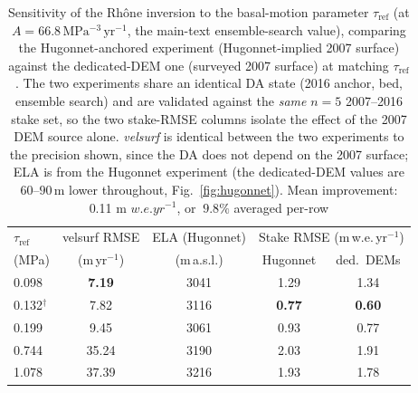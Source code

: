 \begin{table}
  \caption{Sensitivity of the Rhône inversion to the basal-motion parameter
    $\tau_{\mathrm{ref}}$ (at $A=66.8\,\mathrm{MPa^{-3}\,yr^{-1}}$, the main-text
    ensemble-search value), comparing the Hugonnet-anchored experiment
    (Hugonnet-implied 2007 surface) against the dedicated-DEM one (surveyed 2007
    surface) at matching $\tau_{\mathrm{ref}}$. The two experiments share an
    identical DA state (2016 anchor, bed, ensemble search) and are validated
    against the \emph{same} $n=5$ 2007--2016 stake set, so the two stake-RMSE
    columns isolate the effect of the 2007 DEM source alone. \emph{velsurf} is
    identical between the two experiments to the precision shown, since the DA
    does not depend on the 2007 surface; ELA is from the Hugonnet experiment (the
    dedicated-DEM values are $60$--$90\,\mathrm{m}$ lower throughout,
    Fig.~\ref{fig:hugonnet}). Mean improvement: 0.11 m $ w.e. yr^{-1}$, or $~9.8\%$ averaged per-row}
  \label{tab:hugonnet}
  \centering
  \begin{tabular}{lcccc}
    \toprule
    $\tau_{\mathrm{ref}}$ & velsurf RMSE & ELA (Hugonnet) & \multicolumn{2}{c}{Stake RMSE (m\,w.e.\,yr$^{-1}$)} \\
    (MPa) & (m\,yr$^{-1}$) & (m\,a.s.l.) & Hugonnet & ded.\ DEMs \\
    \midrule
    0.098            & \textbf{7.19} & 3041 & 1.29 & 1.34 \\
    0.132$^\dagger$  & 7.82          & 3116 & \textbf{0.77} & \textbf{0.60} \\
    0.199            & 9.45          & 3061 & 0.93 & 0.77 \\
    0.744            & 35.24         & 3190 & 2.03 & 1.91 \\
    1.078            & 37.39         & 3216 & 1.93 & 1.78 \\
    \bottomrule
  \end{tabular}
\end{table}

